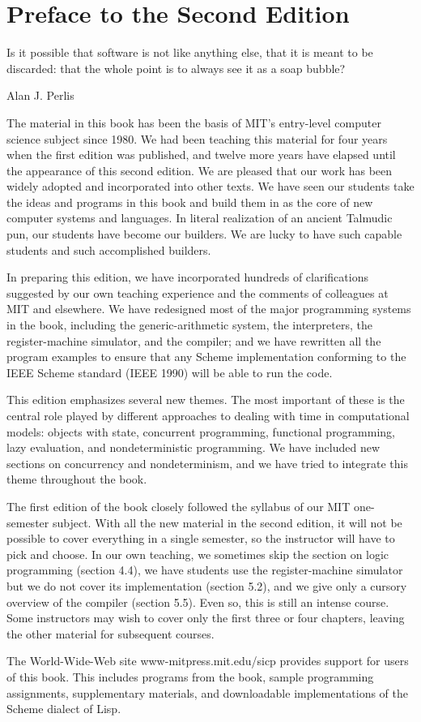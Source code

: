 
\chapter[chap:preface2]{Preface to the Second Edition}

Is it possible that software is not like anything else,
that it is meant to be discarded: that the whole point is to always see it as a soap bubble?

Alan J. Perlis

The material in this book has been the basis of MIT's entry-level computer science subject since 1980.
We had been teaching this material for four years when the first edition was published,
and twelve more years have elapsed until the appearance of this second edition.
We are pleased that our work has been widely adopted and incorporated into other texts.
We have seen our students take the ideas and programs in this book
and build them in as the core of new computer systems and languages.
In literal realization of an ancient Talmudic pun, our students have become our builders.
We are lucky to have such capable students and such accomplished builders.

In preparing this edition,
we have incorporated hundreds of clarifications suggested
by our own teaching experience and the comments of colleagues at MIT and elsewhere.
We have redesigned most of the major programming systems in the book,
including the generic-arithmetic system, the interpreters, the register-machine simulator, and the compiler;
and we have rewritten all the program examples to ensure that
any Scheme implementation conforming to the IEEE Scheme standard (IEEE 1990) will be able to run the code.

This edition emphasizes several new themes.
The most important of these is the central role played by different approaches
to dealing with time in computational models:
objects with state,
concurrent programming,
functional programming,
lazy evaluation,
and nondeterministic programming.
We have included new sections on concurrency and nondeterminism,
and we have tried to integrate this theme throughout the book.

The first edition of the book closely followed the syllabus of our MIT one-semester subject.
With all the new material in the second edition,
it will not be possible to cover everything in a single semester,
so the instructor will have to pick and choose.
In our own teaching,
we sometimes skip the section on logic programming (section 4.4), %
we have students use the register-machine simulator
but we do not cover its implementation (section 5.2), %
and we give only a cursory overview of the compiler (section 5.5). %
Even so, this is still an intense course.
Some instructors may wish to cover only the first three or four chapters,
leaving the other material for subsequent courses.

The World-Wide-Web site www-mitpress.mit.edu/sicp %
provides support for users of this book.
This includes
programs from the book,
sample programming assignments,
supplementary materials,
and downloadable implementations of the Scheme dialect of Lisp.
